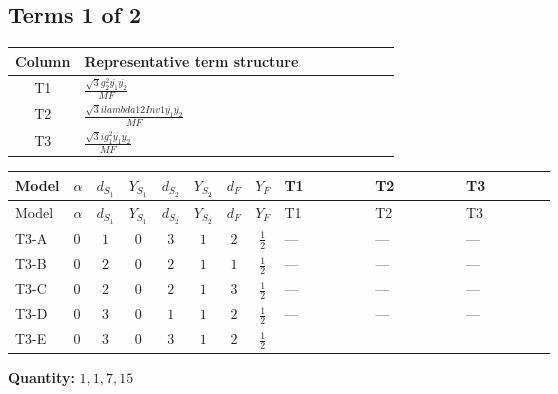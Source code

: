 \documentclass[8pt]{article}
\begin{document}
\begin{landscape}
\subsection*{Terms 1 of 2}
\begin{center}
\begin{tabular}{@{}c >{\raggedright\arraybackslash}p{0.82\linewidth}@{}}
\toprule
Column & Representative term structure \\
\midrule
T1 & \(\displaystyle \frac{\sqrt{3} g_{2}^{2} \overline{y_{1}} \overline{y_{2}}}{MF}\) \\
\midrule
T2 & \(\displaystyle \frac{\sqrt{3} i lambda12Inv1 \overline{y_{1}} \overline{y_{2}}}{MF}\) \\
\midrule
T3 & \(\displaystyle \frac{\sqrt{3} i g_{1}^{2} \overline{y_{1}} \overline{y_{2}}}{MF}\) \\
\midrule
\bottomrule
\end{tabular}
\end{center}
\smallskip
\tiny
\begin{longtable}{@{}llcccccc >{\raggedright\arraybackslash}p{0.21\linewidth} >{\raggedright\arraybackslash}p{0.21\linewidth} >{\raggedright\arraybackslash}p{0.21\linewidth}@{}}
\toprule
Model & $\alpha$ & $d_{S_1}$ & $Y_{S_1}$ & $d_{S_2}$ & $Y_{S_2}$ & $d_F$ & $Y_F$ & T1 & T2 & T3 \\
\midrule
\endfirsthead
\toprule
Model & $\alpha$ & $d_{S_1}$ & $Y_{S_1}$ & $d_{S_2}$ & $Y_{S_2}$ & $d_F$ & $Y_F$ & T1 & T2 & T3 \\
\midrule
\endhead
T3-A & $0$ & $1$ & $0$ & $3$ & $1$ & $2$ & $\frac{1}{2}$ & --- & --- & --- \\
\midrule
T3-B & $0$ & $2$ & $0$ & $2$ & $1$ & $1$ & $\frac{1}{2}$ & --- & --- & --- \\
\midrule
T3-C & $0$ & $2$ & $0$ & $2$ & $1$ & $3$ & $\frac{1}{2}$ & --- & --- & --- \\
\midrule
T3-D & $0$ & $3$ & $0$ & $1$ & $1$ & $2$ & $\frac{1}{2}$ & --- & --- & --- \\
\midrule
T3-E & $0$ & $3$ & $0$ & $3$ & $1$ & $2$ & $\frac{1}{2}$ & \scriptsize\adjustbox{max width=\linewidth}{$\begin{gathered} \frac{\sqrt{3} g_{2}^{2} \overline{y_{1}} \overline{y_{2}}}{6 MF}\end{gathered}$} & \scriptsize\adjustbox{max width=\linewidth}{$\begin{gathered} - \frac{\sqrt{3} i lambda12Inv1 \overline{y_{1}} \overline{y_{2}}}{6 MF}\end{gathered}$} & \scriptsize\adjustbox{max width=\linewidth}{$\begin{gathered} \frac{\sqrt{3} i g_{1}^{2} \overline{y_{1}} \overline{y_{2}}}{8 MF}\end{gathered}$} \\
\midrule
\bottomrule
\end{longtable}
\clearpage
\noindent\textbf{Quantity: }$\mathrm{1,1,7,15}$\par\smallskip

\end{landscape}
\end{document}
